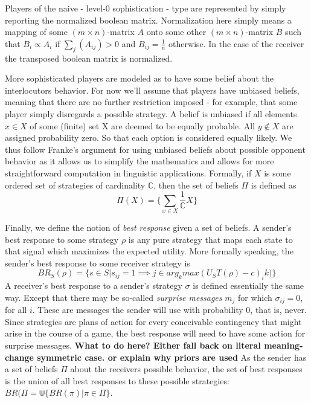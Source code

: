 \documentclass{article}
\begin{document}
Players of the naive - level-0 sophistication - type are represented by simply reporting the normalized boolean matrix. Normalization here simply means a mapping of some $(m\times n)$-matrix $A$ onto some other $(m\times n)$-matrix $B$ such that $B_i\propto A_i$ if $\sum_j (A_{ij})>0$ and $B_{ij}=\tfrac{1}{n}$ otherwise. In the case of the receiver the transposed boolean matrix is normalized.

More sophisticated players are modeled as to have some belief about the interlocutors behavior. For now we'll assume that players have unbiased beliefs, meaning that there are no further restriction imposed - for example, that some player simply disregards a possible strategy. A belief is unbiased if all elements $x\in X$ of some (finite) set X are deemed to be equally probable. All $y\not\in X$ are assigned probability zero. So that each option is considered equally likely. We thus follow Franke's argument for %
 using unbiased beliefs about possible opponent behavior as it allows us to simplify the mathematics and allows for more straightforward computation in linguistic applications. Formally, if $X$ is some ordered set of strategies of cardinality $\mathbb{C}$, then the set of beliefs $\Pi$ is defined as\\
\begin{equation*}
\Pi(X)=\{\sum_{x\in X} \dfrac{1}{\mathbb{C}}X\}
\end{equation*} %

Finally, we define the notion of \textit{best response} given a set of beliefs. A sender's best response to some strategy $\rho$ is any pure strategy that maps each state to that signal which maximizes the expected utility. 
More formally speaking, the sender's best response to some receiver strategy is\\
\begin{equation*}
BR_S(\rho)=\{s\in S | s_{ij}=1\implies j \in arg_kmax(U_S T(\rho)-c)_ik)\}
\end{equation*} 
A receiver's best response to a sender's strategy $\sigma$ is defined essentially the same way. Except that there may be so-called \textit{surprise messages} $m_j$ for which $\sigma_{ij}=0$, for all $i$. These are messages the sender will use with probability 0, that is, never. Since strategies are plans of action for every conceivable contingency that might arise in the course of a game, the best response will need to have some action for surprise messages.
\textbf{What to do here? Either fall back on literal meaning-change symmetric case. or explain why priors are used}
As the sender has a set of beliefs $\Pi$ about the receivers possible behavior, the set of best responses is the union of all best responses to these possible strategies: $BR(\Pi=\Cup\{BR(\pi)|\pi\in\Pi\}$.
\end{document}
